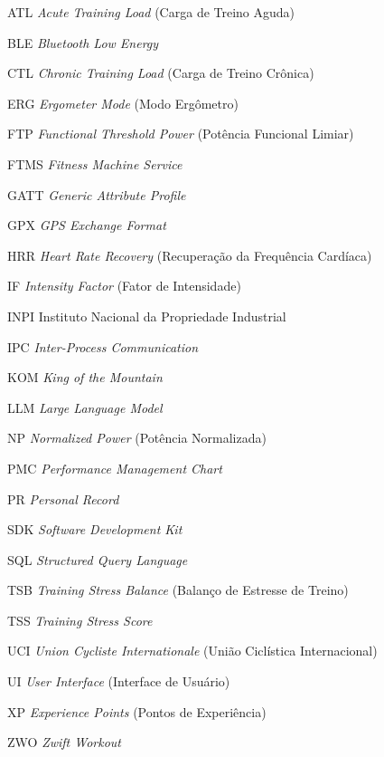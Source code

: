 \begin{siglas}
    \item[ATL] \textit{Acute Training Load} (Carga de Treino Aguda)
    \item[BLE] \textit{Bluetooth Low Energy}
    \item[CTL] \textit{Chronic Training Load} (Carga de Treino Crônica)
    \item[ERG] \textit{Ergometer Mode} (Modo Ergômetro)
    \item[FTP] \textit{Functional Threshold Power} (Potência Funcional Limiar)
    \item[FTMS] \textit{Fitness Machine Service}
    \item[GATT] \textit{Generic Attribute Profile}
    \item[GPX]  \textit{GPS Exchange Format}
    \item[HRR]  \textit{Heart Rate Recovery} (Recuperação da Frequência Cardíaca)
    \item[IF]   \textit{Intensity Factor} (Fator de Intensidade)
    \item[INPI] Instituto Nacional da Propriedade Industrial
    \item[IPC]  \textit{Inter-Process Communication}
    \item[KOM]  \textit{King of the Mountain}
    \item[LLM]  \textit{Large Language Model}
    \item[NP]   \textit{Normalized Power} (Potência Normalizada)
    \item[PMC]  \textit{Performance Management Chart}
    \item[PR]   \textit{Personal Record}
    \item[SDK]  \textit{Software Development Kit}
    \item[SQL]  \textit{Structured Query Language}
    \item[TSB]  \textit{Training Stress Balance} (Balanço de Estresse de Treino)
    \item[TSS]  \textit{Training Stress Score}
    \item[UCI]  \textit{Union Cycliste Internationale} (União Ciclística Internacional)
    \item[UI]   \textit{User Interface} (Interface de Usuário)
    \item[XP]   \textit{Experience Points} (Pontos de Experiência)
    \item[ZWO]  \textit{Zwift Workout}
\end{siglas}

\clearpage
